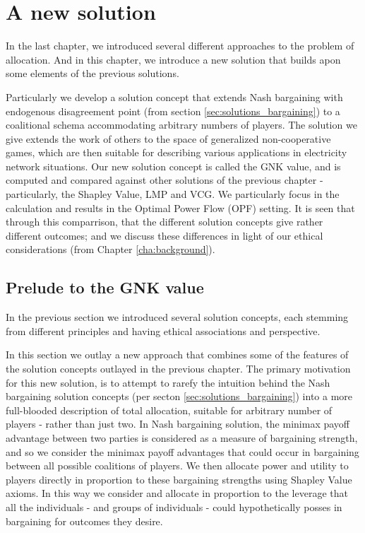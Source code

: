 \chapter{A new solution}
\label{cha:new_solution}

In the last chapter, we introduced several different approaches to the problem of allocation.
And in this chapter, we introduce a new solution that builds apon some elements of the previous solutions.

Particularly we develop a solution concept that extends Nash bargaining with endogenous disagreement point (from section \ref{sec:solutions_bargaining}) to a coalitional schema accommodating arbitrary numbers of players.
The solution we give extends the work of others to the space of generalized non-cooperative games, which are then suitable for describing various applications in electricity network situations.
Our new solution concept is called the GNK value, and is computed and compared against other solutions of the previous chapter - particularly, the Shapley Value, LMP and VCG.
We particularly focus in the calculation and results in the Optimal Power Flow (OPF) setting.
It is seen that through this comparrison, that the different solution concepts give rather different outcomes; and we discuss these differences in light of our ethical considerations (from Chapter \ref{cha:background}).

\section{Prelude to the GNK value}

In the previous section we introduced several solution concepts, each stemming from different principles and having ethical associations and perspective.

In this section we outlay a new approach that combines some of the features of the solution concepts outlayed in the previous chapter.
The primary motivation for this new solution, is to attempt to rarefy the intuition behind the Nash bargaining solution concepts (per secton \ref{sec:solutions_bargaining}) into a more full-blooded description of total allocation, suitable for arbitrary number of players - rather than just two.
In Nash bargaining solution, the minimax payoff advantage between two parties is considered as a measure of bargaining strength, and so we consider the minimax payoff advantages that could occur in bargaining between all possible coalitions of players.
We then allocate power and utility to players directly in proportion to these bargaining strengths using Shapley Value axioms.
In this way we consider and allocate in proportion to the leverage that all the individuals - and groups of individuals - could hypothetically posses in bargaining for outcomes they desire.

